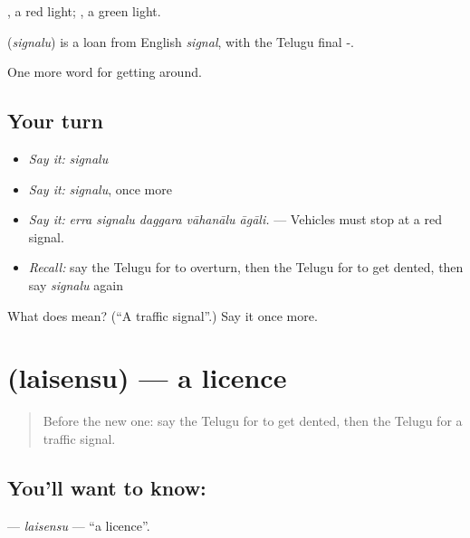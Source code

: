  , a red light;  , a green light.

\begin{cousinweb}
\textbf{} (\emph{signalu}) is a loan from English \emph{signal}, with the Telugu final -.
\end{cousinweb}

\begin{grammarlens}[title={What you've built}]
One more word for getting around.
\end{grammarlens}

\subsection*{Your turn}
\begin{itemize}
\raggedright
  \item \emph{Say it:} \emph{signalu}
  \item \emph{Say it:} \emph{signalu}, once more
  \item \emph{Say it:} \emph{erra signalu daggara vāhanālu āgāli.} — Vehicles must stop at a red signal.
  \item \emph{Recall:} say the Telugu for to overturn, then the Telugu for to get dented, then say \emph{signalu} again
\end{itemize}

\begin{tcolorbox}[breakable,colback=teal!4,colframe=teal!35!black,title={Before you move on}]
What does  mean? (\textquotedblleft{}A traffic signal\textquotedblright{}.) Say it once more.
\end{tcolorbox}
\section[\texorpdfstring{\te{లైసెన్సు} (laisensu)}{లైసెన్సు (laisensu)}]{ (laisensu) — a licence}

\label{lesson:TE-C447-laisensu}



\begin{quote}
Before the new one: say the Telugu for to get dented, then the Telugu for a traffic signal.
\end{quote}

\subsection*{You'll want to know: }
\textbf{} — \emph{laisensu} — \textquotedblleft{}a licence\textquotedblright{}.

